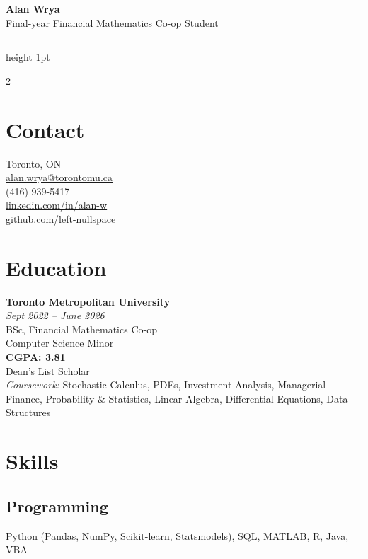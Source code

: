 \documentclass[10pt,letterpaper]{article}
\begin{document}
\noindent
{\fontsize{28pt}{30pt}\selectfont\color{accent}\bfseries Alan Wrya}\\[2pt]
{\small\color{soft} Final-year Financial Mathematics Co-op Student}

\vspace{8pt}
{\color{accent}\hrule height 1pt}
\vspace{6pt}

\begin{paracol}{2}

\section*{Contact}
\small
Toronto, ON\\[2pt]
\href{mailto:alan.wrya@torontomu.ca}{alan.wrya@torontomu.ca}\\[2pt]
(416) 939-5417\\[2pt]
\href{https://www.linkedin.com/in/alan-w-499547298/}{linkedin.com/in/alan-w}\\[2pt]
\href{https://github.com/left-nullspace}{github.com/left-nullspace}

\section*{Education}
\noindent\textbf{Toronto Metropolitan University}\\[1pt]
{\small\itshape\color{soft} Sept 2022 -- June 2026}\\[2pt]
BSc, Financial Mathematics Co-op\\
Computer Science Minor\\[2pt]
\textbf{CGPA: 3.81}\\
Dean's List Scholar\\[2pt]
{\small\itshape\color{soft}Coursework:} Stochastic Calculus, PDEs, Investment Analysis, Managerial Finance, Probability \& Statistics, Linear Algebra, Differential Equations, Data Structures

\section*{Skills}
\subsection*{Programming}
\small Python (Pandas, NumPy, Scikit-learn, Statsmodels), SQL, MATLAB, R, Java, VBA


\end{paracol}
\end{document}
